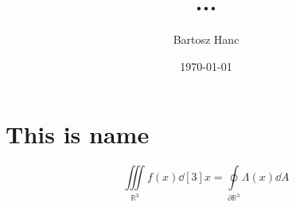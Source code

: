 \documentclass[a4paper]{article}
\date{\today}
\author{Bartosz Hanc}
\title{...}
\begin{document}
\maketitle

\section{This is name}
\lipsum[1-5]

\[
	\iiint\limits_{\mathbb{R}^3} f(x) \dd[3]{x} = \oint\limits_{\partial \mathbb{R}^3} \Lambda(x) \dd{A}
\]
\end{document}
